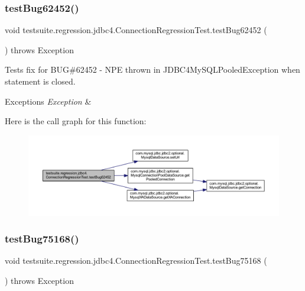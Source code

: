 \subsubsection{\texorpdfstring{test\+Bug62452()}{testBug62452()}}
{\footnotesize\ttfamily void testsuite.\+regression.\+jdbc4.\+Connection\+Regression\+Test.\+test\+Bug62452 (\begin{DoxyParamCaption}{ }\end{DoxyParamCaption}) throws Exception}

Tests fix for B\+UG\#62452 -\/ N\+PE thrown in J\+D\+B\+C4\+My\+S\+Q\+L\+Pooled\+Exception when statement is closed.


\begin{DoxyExceptions}{Exceptions}
{\em Exception} & \\
\hline
\end{DoxyExceptions}
Here is the call graph for this function\+:
\nopagebreak
\begin{figure}[H]
\begin{center}
\leavevmode
\includegraphics[width=350pt]{classtestsuite_1_1regression_1_1jdbc4_1_1_connection_regression_test_a15cc5d9ae0ab3041f166565d1dc1e577_cgraph}
\end{center}
\end{figure}
\mbox{\label{classtestsuite_1_1regression_1_1jdbc4_1_1_connection_regression_test_acc4c393fcbc483c6a959f10f561bb1b7}} 
\subsubsection{\texorpdfstring{test\+Bug75168()}{testBug75168()}}
{\footnotesize\ttfamily void testsuite.\+regression.\+jdbc4.\+Connection\+Regression\+Test.\+test\+Bug75168 (\begin{DoxyParamCaption}{ }\end{DoxyParamCaption}) throws Exception}

